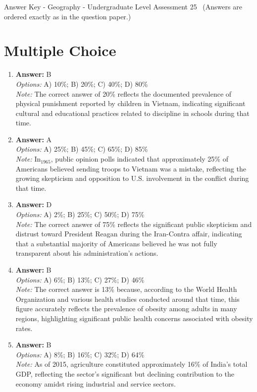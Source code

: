 \documentclass[12pt]{article}
\begin{document}
\begin{center}
Answer Key - Geography - Undergraduate Level Assessment 25 \
\small (Answers are ordered exactly as in the question paper.)
\end{center}

\section*{Multiple Choice}
\begin{enumerate}[label=\arabic*.]
\item \textbf{Answer:} B
\\ \textit{Options:} A) 10\%; B) 20\%; C) 40\%; D) 80\%
\\ \textit{Note:} The correct answer of 20\% reflects the documented prevalence of physical punishment reported by children in Vietnam, indicating significant cultural and educational practices related to discipline in schools during that time.
\item \textbf{Answer:} A
\\ \textit{Options:} A) 25\%; B) 45\%; C) 65\%; D) 85\%
\\ \textit{Note:} In$_{1965}$, public opinion polls indicated that approximately 25\% of Americans believed sending troops to Vietnam was a mistake, reflecting the growing skepticism and opposition to U.S. involvement in the conflict during that time.
\item \textbf{Answer:} D
\\ \textit{Options:} A) 2\%; B) 25\%; C) 50\%; D) 75\%
\\ \textit{Note:} The correct answer of 75\% reflects the significant public skepticism and distrust toward President Reagan during the Iran-Contra affair, indicating that a substantial majority of Americans believed he was not fully transparent about his administration's actions.
\item \textbf{Answer:} B
\\ \textit{Options:} A) 6\%; B) 13\%; C) 27\%; D) 46\%
\\ \textit{Note:} The correct answer is 13\% because, according to the World Health Organization and various health studies conducted around that time, this figure accurately reflects the prevalence of obesity among adults in many regions, highlighting significant public health concerns associated with obesity rates.
\item \textbf{Answer:} B
\\ \textit{Options:} A) 8\%; B) 16\%; C) 32\%; D) 64\%
\\ \textit{Note:} As of 2015, agriculture constituted approximately 16\% of India's total GDP, reflecting the sector's significant but declining contribution to the economy amidst rising industrial and service sectors.
\end{enumerate}
\end{document}
